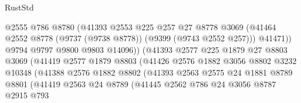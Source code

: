 \begin{lexlean}{RustStd}
\begin{coremodule}
                                  @2555
                                  @786
                                  @8780
                                  (@41393
                                    @2553
                                    @225
                                    @257
                                    @27
                                    @8778
                                    @3069
                                    (@41464
                                      @2552
                                      @8778
                                      (@9737 (@9738 @8778))
                                      (@9399 (@9743 @2552 @257)))
                                    @41471))
                                @9794
                                @9797
                                @9800
                                @9803
                                @14096))
                            (@41393
                              @2577
                              @225
                              @1879
                              @27
                              @8803
                              @3069
                              (@41419
                                @2577
                                @1879
                                @8803
                                (@41426
                                  @2576
                                  @1882
                                  @3056
                                  @8802
                                  @3232
                                  @10348
                                  (@41388
                                    @2576
                                    @1882
                                    @8802
                                    (@41393
                                      @2563
                                      @2575
                                      @24
                                      @1881
                                      @8789
                                      @8801
                                      (@41419
                                        @2563
                                        @24
                                        @8789
                                        (@41445
                                          @2562
                                          @786
                                          @24
                                          @3056
                                          @8787
                                          @2915
                                          @793

\end{coremodule}
\end{lexlean}
